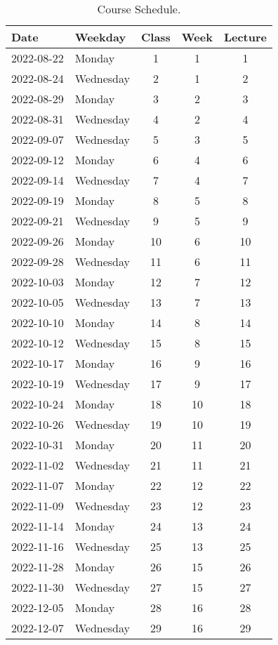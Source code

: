 \documentclass[11pt,]{article}
\begin{document}
\begin{table}[!h]

\caption{\label{tab:course_schedule}Course Schedule.}
\centering
\fontsize{10}{12}\selectfont
\begin{tabular}[t]{llccc}
\toprule
\textbf{Date} & \textbf{Weekday} & \textbf{Class} & \textbf{Week} & \textbf{Lecture}\\
\midrule
2022-08-22 & Monday & 1 & 1 & 1\\
2022-08-24 & Wednesday & 2 & 1 & 2\\
2022-08-29 & Monday & 3 & 2 & 3\\
2022-08-31 & Wednesday & 4 & 2 & 4\\
2022-09-07 & Wednesday & 5 & 3 & 5\\
2022-09-12 & Monday & 6 & 4 & 6\\
2022-09-14 & Wednesday & 7 & 4 & 7\\
2022-09-19 & Monday & 8 & 5 & 8\\
2022-09-21 & Wednesday & 9 & 5 & 9\\
2022-09-26 & Monday & 10 & 6 & 10\\
2022-09-28 & Wednesday & 11 & 6 & 11\\
2022-10-03 & Monday & 12 & 7 & 12\\
2022-10-05 & Wednesday & 13 & 7 & 13\\
2022-10-10 & Monday & 14 & 8 & 14\\
2022-10-12 & Wednesday & 15 & 8 & 15\\
2022-10-17 & Monday & 16 & 9 & 16\\
2022-10-19 & Wednesday & 17 & 9 & 17\\
2022-10-24 & Monday & 18 & 10 & 18\\
2022-10-26 & Wednesday & 19 & 10 & 19\\
2022-10-31 & Monday & 20 & 11 & 20\\
2022-11-02 & Wednesday & 21 & 11 & 21\\
2022-11-07 & Monday & 22 & 12 & 22\\
2022-11-09 & Wednesday & 23 & 12 & 23\\
2022-11-14 & Monday & 24 & 13 & 24\\
2022-11-16 & Wednesday & 25 & 13 & 25\\
2022-11-28 & Monday & 26 & 15 & 26\\
2022-11-30 & Wednesday & 27 & 15 & 27\\
2022-12-05 & Monday & 28 & 16 & 28\\
2022-12-07 & Wednesday & 29 & 16 & 29\\
\bottomrule
\end{tabular}
\end{table}
\end{document}
